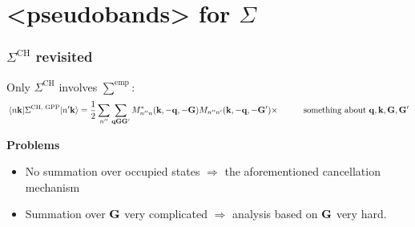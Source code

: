 \documentclass[t,aspectratio=169]{beamer}
\newcommand{\xmark}{\ding{55}}%
\newcommand{\shortcode}[1]{\texttt{#1}}
\def\\{}%
\def\texttt#1{<#1>}%
\begin{document}
\section{\shortcode{pseudobands} for $\Sigma$}

\begin{frame}
\frametitle{$\Sigma^{\text{CH}}$ revisited}

Only $\Sigma^{\text{CH}}$ involves $\sum^{\text{emp}}$:
\begin{equation*}
    \begin{aligned}
        \mel*{n \vb{k}}{\Sigma^{\text{CH, GPP}}}{n' \vb{k}} 
        &= \frac{1}{2} \sum_{n''} \sum_{\vb{q} \vb{G} \vb{G}'} M_{n'' n}^*(\vb{k}, - \vb{q}, -\vb{G})
        M_{n'' n'}(\vb{k}, - \vb{q}, - \vb{G}') \times  \\
        &\quad \quad \text{something about $\vb{q}, \vb{k}, \vb{G}, \vb{G}'$}
    \end{aligned}
    \label{eq:ch.simple}
\end{equation*}

\textbf{Problems} \begin{itemize}
    \item No summation over occupied states $\Rightarrow$ 
    \xmark the aforementioned cancellation mechanism 
    \item Summation over $\vb{G}$ very complicated $\Rightarrow$
    analysis based on $\vb{G}$ very hard.
\end{itemize}

\end{frame}
\end{document}
